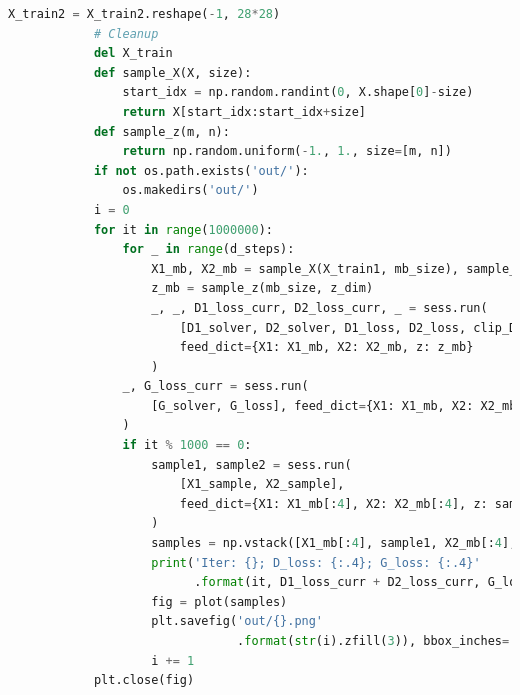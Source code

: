 \begin{lstlisting}[language = Python]
            X_train2 = X_train2.reshape(-1, 28*28)
            # Cleanup
            del X_train
            def sample_X(X, size):
                start_idx = np.random.randint(0, X.shape[0]-size)
                return X[start_idx:start_idx+size]
            def sample_z(m, n):
                return np.random.uniform(-1., 1., size=[m, n])
            if not os.path.exists('out/'):
                os.makedirs('out/')
            i = 0
            for it in range(1000000):
                for _ in range(d_steps):
                    X1_mb, X2_mb = sample_X(X_train1, mb_size), sample_X(X_train2, mb_size)
                    z_mb = sample_z(mb_size, z_dim)
                    _, _, D1_loss_curr, D2_loss_curr, _ = sess.run(
                        [D1_solver, D2_solver, D1_loss, D2_loss, clip_D],
                        feed_dict={X1: X1_mb, X2: X2_mb, z: z_mb}
                    )
                _, G_loss_curr = sess.run(
                    [G_solver, G_loss], feed_dict={X1: X1_mb, X2: X2_mb, z: z_mb}
                )
                if it % 1000 == 0:
                    sample1, sample2 = sess.run(
                        [X1_sample, X2_sample],
                        feed_dict={X1: X1_mb[:4], X2: X2_mb[:4], z: sample_z(4, z_dim)}
                    )
                    samples = np.vstack([X1_mb[:4], sample1, X2_mb[:4], sample2])
                    print('Iter: {}; D_loss: {:.4}; G_loss: {:.4}'
                          .format(it, D1_loss_curr + D2_loss_curr, G_loss_curr))
                    fig = plot(samples)
                    plt.savefig('out/{}.png'
                                .format(str(i).zfill(3)), bbox_inches='tight')
                    i += 1
            plt.close(fig)
            \end{lstlisting}

